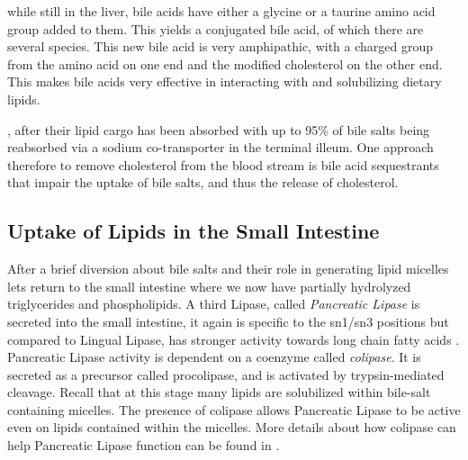 \documentclass{tufte-handout}
\begin{document}
  while still in the liver, bile acids have either a glycine or a taurine amino acid group added to them.  This yields a conjugated bile acid, of which there are several species.  This new bile acid is very amphipathic, with a charged group from the amino acid on one end and the modified cholesterol on the other end.  This makes bile acids very effective in interacting with and solubilizing dietary lipids.

, after their lipid cargo has been absorbed with up to 95\% of bile salts being reabsorbed via a sodium co-transporter in the terminal illeum.  One approach therefore to remove cholesterol from the blood stream is bile acid sequestrants that impair the uptake of bile salts, and thus the release of cholesterol.

\subsection{Uptake of Lipids in the Small Intestine}

After a brief diversion about bile salts and their role in generating lipid micelles lets return to the small intestine where we now have partially hydrolyzed triglycerides and phospholipids.  A third Lipase, called \emph{Pancreatic Lipase} is secreted into the small intestine, it again is specific to the sn1/sn3 positions but compared to Lingual Lipase, has stronger activity towards long chain fatty acids \citep{Jensen1983}.  Pancreatic Lipase activity is dependent on a coenzyme called \emph{colipase}.  It is secreted as a precursor called procolipase, and is activated by trypsin-mediated cleavage.  Recall that at this stage many lipids are solubilized within bile-salt containing micelles.  The presence of colipase allows Pancreatic Lipase to be active even on lipids contained within the micelles.  More details about how colipase can help Pancreatic Lipase function can be found in \citet{VanTilbeurgh1999}.
\end{document}
